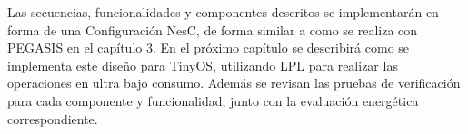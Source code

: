 Las secuencias, funcionalidades y componentes descritos se implementarán en forma de una Configuración NesC, de forma similar a como se realiza con PEGASIS en el capítulo 3. En el próximo capítulo se describirá como se implementa este diseño para TinyOS, utilizando LPL para realizar las operaciones en ultra bajo consumo. Además se revisan las pruebas de verificación para cada componente y funcionalidad, junto con la evaluación energética correspondiente.